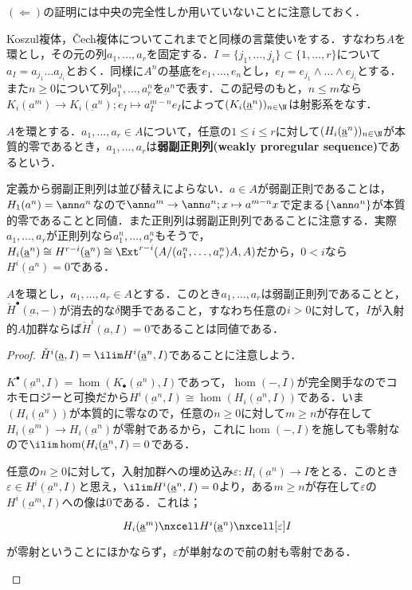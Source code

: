 $(\Longleftarrow)$の証明には中央の完全性しか用いていないことに注意しておく．

Koszul複体，\v{C}ech複体についてこれまでと同様の言葉使いをする．すなわち$A$を環とし，その元の列$a_1,\dots,a_r$を固定する．$I=\{j_1,\dots,j_i\}\subset\{1,\dots,r\}$について$a_I=a_{j_1}\dots a_{j_i}$とおく．同様に$A^n$の基底を$e_1,\dots,e_n$とし，$e_I=e_{j_1}\wedge\dots\wedge e_{j_i}$とする．また$n\geq 0$について列$a_1^n,\dots,a_r^n$を$\underbar{a}^n$で表す．この記号のもと，$n\leq m$なら$K_i(\underbar{a}^m)\to K_i(\underbar{a}^n);e_I\mapsto a_I^{m-n}e_I$によって$(K_i(\underbar{a}^n))_{n\in\N}$は射影系をなす．

\begin{defi}[弱副正則列]
	$A$を環とする．$a_1,\dots,a_r\in A$について，任意の$1\leq i\leq r$に対して$(H_i(\underbar{a}^n))_{n\in\N}$が本質的零であるとき，$a_1,\dots,a_r$は\textbf{弱副正則列(weakly proregular sequence)}であるという．
\end{defi}

定義から弱副正則列は並び替えによらない．$a\in A$が弱副正則であることは，$H_1(a^n)=\ann a^n$なので$\ann a^m\to\ann a^n;x\mapsto a^{m-n}x$で定まる$\{\ann a^n\}$が本質的零であることと同値．また正則列は弱副正則列であることに注意する．実際$a_1,\dots,a_r$が正則列なら$a_1^n,\dots,a_r^n$もそうで，$H_i(\underbar{a}^n)\cong
H^{r-i}(\underbar{a}^n)\cong\Ext^{r-i}(A/(a_1^n,\dots,a_r^n)A,A)$だから，$0<i$なら$H^i(\underbar{a}^n)=0$である．

\begin{prop}\label{prop:w.proregとCechがeffaceableが同値}
	$A$を環とし，$a_1,\dots,a_r\in A$とする．このとき$a_1,\dots,a_r$は弱副正則列であることと，$\check{H}^\bullet(\underbar{a},-)$が消去的な$\delta$関手であること，すなわち任意の$i>0$に対して，$I$が入射的$A$加群ならば$\check{H}^i(\underbar{a},I)=0$であることは同値である．
\end{prop}

\begin{proof}
	$\check{H}^i(\underbar{a},I)=\ilim H^i(\underbar{a}^n,I)$であることに注意しよう．
	\begin{eqv}
		\item $K^\bullet(\underbar{a}^n,I)=\hom(K_\bullet(\underbar{a}^n),I)$であって，$\hom(-,I)$が完全関手なのでコホモロジーと可換だから$H^i(\underbar{a}^n,I)\cong\hom(H_i(\underbar{a}^n,I))$である．いま$(H_i(\underbar{a}^n))$が本質的に零なので，任意の$n\geq 0$に対して$m\geq n$が存在して$H_i(\underbar{a}^m)\to H_i(\underbar{a}^n)$が零射であるから，これに$\hom(-,I)$を施しても零射なので$\ilim\hom(H_i(\underbar{a}^n,I)=0$である．
		\item
		任意の$n\geq 0$に対して，入射加群への埋め込み$\varepsilon:H_i(\underbar{a}^n)\to I$をとる．このとき$\varepsilon\in H^i(\underbar{a}^n,I)$と思え，$\ilim H^i(\underbar{a}^n,I)=0$より，ある$m\geq n$が存在して$\varepsilon$の$H^i(\underbar{a}^m,I)$への像は$0$である．これは；
		\[\begin{tikzcd}H_i(\underbar{a}^m)\nxcell H^i(\underbar{a}^n)\nxcell[\varepsilon] I\end{tikzcd}\]
		が零射ということにほかならず，$\varepsilon$が単射なので前の射も零射である．
	\end{eqv}
\end{proof}

